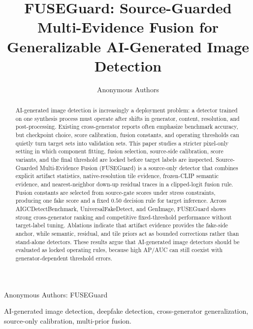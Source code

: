\documentclass[letterpaper,journal]{IEEEtran}
\begin{document}
\title{FUSEGuard: Source-Guarded Multi-Evidence Fusion for Generalizable AI-Generated Image Detection}

\author{Anonymous Authors}

%
{Anonymous Authors: FUSEGuard}

\maketitle

\begin{abstract}
AI-generated image detection is increasingly a deployment problem: a detector trained on one synthesis process must operate after shifts in generator, content, resolution, and post-processing. Existing cross-generator reports often emphasize benchmark accuracy, but checkpoint choice, score calibration, fusion constants, and operating thresholds can quietly turn target sets into validation sets. This paper studies a stricter pixel-only setting in which component fitting, fusion selection, source-side calibration, score variants, and the final threshold are locked before target labels are inspected. Source-Guarded Multi-Evidence Fusion (FUSEGuard) is a source-only detector that combines explicit artifact statistics, native-resolution tile evidence, frozen-CLIP semantic evidence, and nearest-neighbor down-up residual traces in a clipped-logit fusion rule. Fusion constants are selected from source-gate scores under stress constraints, producing one fake score and a fixed $0.50$ decision rule for target inference. Across AIGCDetectBenchmark, UniversalFakeDetect, and GenImage, FUSEGuard shows strong cross-generator ranking and competitive fixed-threshold performance without target-label tuning. Ablations indicate that artifact evidence provides the fake-side anchor, while semantic, residual, and tile priors act as bounded corrections rather than stand-alone detectors. These results argue that AI-generated image detectors should be evaluated as locked operating rules, because high AP/AUC can still coexist with generator-dependent threshold errors.
\end{abstract}

\begin{IEEEkeywords}
AI-generated image detection, deepfake detection, cross-generator generalization, source-only calibration, multi-prior fusion.
\end{IEEEkeywords}
\end{document}
